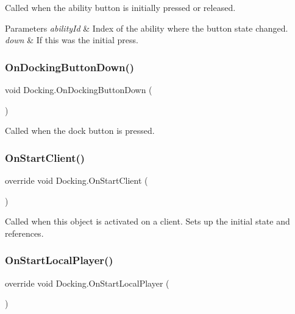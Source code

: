 Called when the ability button is initially pressed or released. 


\begin{DoxyParams}{Parameters}
{\em ability\+Id} & Index of the ability where the button state changed.\\
\hline
{\em down} & If this was the initial press.\\
\hline
\end{DoxyParams}
\hypertarget{class_docking_ace85f096874db1f744af753a2f9e44ce}{}\label{class_docking_ace85f096874db1f744af753a2f9e44ce} 
\subsubsection{\texorpdfstring{On\+Docking\+Button\+Down()}{OnDockingButtonDown()}}
{\footnotesize\ttfamily void Docking.\+On\+Docking\+Button\+Down (\begin{DoxyParamCaption}{ }\end{DoxyParamCaption})}



Called when the dock button is pressed. 

\hypertarget{class_docking_aa14ecfa7a3221dd327d0a4aa32ecdf38}{}\label{class_docking_aa14ecfa7a3221dd327d0a4aa32ecdf38} 
\subsubsection{\texorpdfstring{On\+Start\+Client()}{OnStartClient()}}
{\footnotesize\ttfamily override void Docking.\+On\+Start\+Client (\begin{DoxyParamCaption}{ }\end{DoxyParamCaption})}



Called when this object is activated on a client. Sets up the initial state and references. 

\hypertarget{class_docking_a056ea40ea6f2afb8ba492970f042fc17}{}\label{class_docking_a056ea40ea6f2afb8ba492970f042fc17} 
\subsubsection{\texorpdfstring{On\+Start\+Local\+Player()}{OnStartLocalPlayer()}}
{\footnotesize\ttfamily override void Docking.\+On\+Start\+Local\+Player (\begin{DoxyParamCaption}{ }\end{DoxyParamCaption})}



